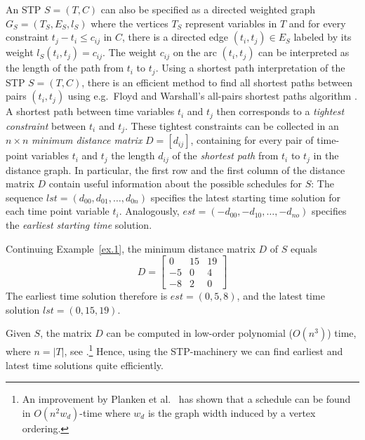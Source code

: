 An STP $S = (T, C)$ can also be specified as a directed weighted graph $G_S = ( T_S, E_S, l_S )$ where the vertices $T_S$ represent variables in $T$ and for every constraint $t_j - t_i \leq c_{ij}$ in $C$, 
there is a directed edge $(t_i, t_j) \in E_S$ labeled by its weight $l_S(t_i, t_j) = c_{ij}$. 
The weight $c_{ij}$ on the arc $(t_i, t_j)$ can be interpreted as the length of the path from $t_i$ to $t_j$. 
Using a shortest path interpretation of the STP $S=(T,C)$, there is an efficient method to find all shortest paths between pairs $(t_i, t_j)$  
using e.g.\ Floyd and Warshall's all-pairs shortest paths algorithm \cite{floyd:1962}. 
A shortest path between time variables $t_i$ and $t_j$ then corresponds to a \emph{tightest constraint} between $t_i$ and $t_j$. These tightest constraints can be collected  in an $n\times n$ \emph{minimum distance matrix} $D = [ d_{ij}]$, containing for every pair of time-point variables $t_i$ and $t_j$ the length $d_{ij}$ of the \emph{shortest path} from $t_i$ to $t_j$ in the distance graph.  
In particular, the first row and the first column of the distance matrix $D$ contain useful information about the possible schedules for $S$:
The sequence $lst = (d_{00},d_{01}, \ldots, d_{0n})$ specifies the latest starting time solution for each time point variable $t_i$. 
Analogously, $est = (-d_{00}, -d_{10}, \ldots, -d_{no})$ specifies the \emph{earliest starting time} solution.

\begin{example} \label{ex.2}
Continuing Example~\ref{ex.1}, the minimum distance matrix $D$ of $S$ equals
\begin{equation*}
D = \left[\begin{array}{ccc}
                  0 & 15 & 19  \\
                  -5 & 0 & 4  \\
                  -8 & 2  & 0
\end{array}  \right]
\end{equation*}
The earliest time solution therefore is $est = (0, 5 ,8)$, and the latest time solution $lst = ( 0, 15, 19)$. \blbox
\end{example}
Given $S$, the matrix $D$  can be computed in low-order polynomial ($O(n^3)$) time, where $n = |T|$, see \cite{dechter:2003}.\footnote{An improvement by Planken et al.~\cite{planken:2012} has shown that a schedule can be found in $O(n^2w_d)$-time where $w_d$ is the graph width induced by a vertex ordering.} Hence, using the STP-machinery we can find earliest and latest time solutions quite efficiently.
